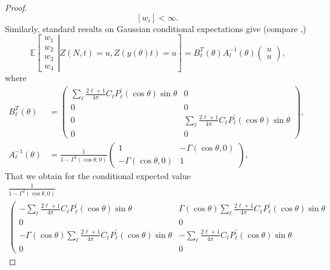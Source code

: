 \documentclass[AHL,Unicode,longabstracts,published]{cedram}
\newcommand{\bbE}{\mathbb{E}}
\begin{document}
\begin{proof}
\begin{equation*}
\left[w_{i}\right] <\infty \text{.}
\end{equation*}
Similarly, standard results on Gaussian conditional expectations give (compare \cite[App\-endix A]{Wig},)
\begin{equation*}
\bbE\left[\left.
\begin{array}{c}
w_{1} \\
w_{2} \\
w_{3} \\
w_{4}
\end{array}
\right\vert Z(N,t)=u,Z(y(\theta)t)=u\right] =B_{\ell }^{T}(\theta)A_{\ell }^{-1}(\theta)\left(
\begin{array}{c}
u \\
u
\end{array}
\right) \text{,}
\end{equation*}
where
\begin{align*}
B_{\ell }^{T}(\theta) &=\left(
\begin{array}{cc}
\sum_{\ell }\frac{2\ell +1}{4\pi }C_{\ell }P_{\ell }^{\prime }(\cos \theta)\sin \theta & 0 \\
0 & 0 \\
0 & \sum_{\ell }\frac{2\ell +1}{4\pi }C_{\ell }P_{\ell }^{\prime }(\cos
\theta)\sin \theta \\
0 & 0
\end{array}
\right) \text{, } \\
A_{\ell }^{-1}(\theta) &=\frac{1}{1-\Gamma ^{2}(\cos \theta,0)}\left(
\begin{array}{cc}
1 & -\Gamma (\cos \theta,0) \\
-\Gamma (\cos \theta,0) & 1
\end{array}
\right) \text{,}
\end{align*}
That we obtain for the conditional expected value
\begin{multline*}
\frac{1}{1-\Gamma ^{2}(\cos \theta,0)}\\
\left(
\begin{array}{cc}
-\sum_{\ell }\frac{2\ell +1}{4\pi }C_{\ell }P_{\ell }^{\prime }(\cos \theta)\sin \theta & \Gamma (\cos \theta)\sum_{\ell }\frac{2\ell +1}{4\pi } C_{\ell }P_{\ell }^{\prime }(\cos \theta)\sin \theta \\
0 & 0 \\
-\Gamma (\cos \theta)\sum_{\ell }\frac{2\ell +1}{4\pi }C_{\ell }P_{\ell }^{\prime }(\cos \theta)\sin \theta & -\sum_{\ell }\frac{2\ell +1}{4\pi } C_{\ell }P_{\ell }^{\prime }(\cos \theta)\sin \theta \\
0 & 0
\end{array}

\end{multline*}
\end{proof}
\end{document}
